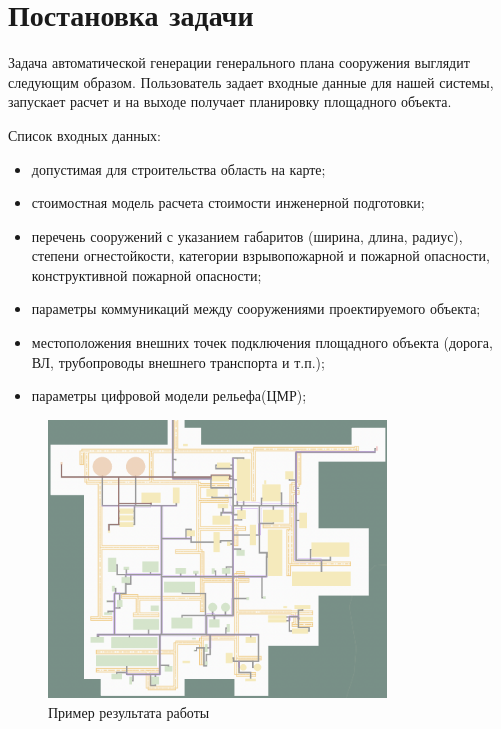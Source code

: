 \section*{\Large{Постановка задачи}}
Задача автоматической генерации генерального плана сооружения выглядит следующим образом.
Пользователь задает входные данные для нашей системы, запускает расчет и на выходе получает планировку площадного объекта.

\noindent Список входных данных:
\begin{itemize}
    \item допустимая для строительства область на карте;
    \item стоимостная модель расчета стоимости инженерной подготовки;
    \item перечень сооружений с указанием габаритов (ширина, длина, радиус),
    степени огнестойкости, категории взрывопожарной и пожарной опасности, конструктивной пожарной опасности;
    \item параметры коммуникаций между сооружениями проектируемого объекта;
    \item местоположения внешних точек подключения площадного объекта (дорога, ВЛ, трубопроводы внешнего транспорта и т.п.);
    \item параметры цифровой модели рельефа(ЦМР);
\end{itemize}

\begin{figure}
    \begin{center}
        \includegraphics[width=0.8\textwidth]{images/problem/1}
    \end{center}
    \caption{Пример результата работы}
    \label{pic:problem__site_plan}
\end{figure}

